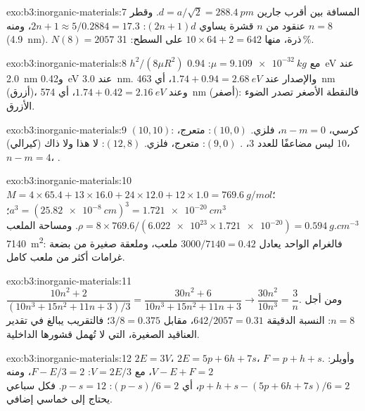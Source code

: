 \begin{solution}{exo:b3:inorganic-materials:7}
المسافة بين أقرب جارين $d = a/\sqrt2 = \qty{288.4}{pm}$. وقطر عنقود من $n$ قشرة يساوي $(2n + 1)d$:
$2n + 1 \approx 5/0.2884 = 17.3$، ومنه $n = 8$ (\qty{4.9}{nm}). $N(8) = 2057$ ذرة، منها $10 \times 64 + 2 = 642$ على السطح:
31\,\%.
\end{solution}

\begin{solution}{exo:b3:inorganic-materials:8}
$h^2/(8\mu R^2)$ مع $\mu = \qty{9.109e-32}{kg}$: \qty{0.94}{eV} عند \qty{2.0}{nm} و\qty{0.42}{eV} عند \qty{3.0}{nm}. والإصدار عند
$1.74 + 0.94 = \qty{2.68}{eV}$، أي \qty{463}{nm} (أزرق)، وعند $1.74 + 0.42 = \qty{2.16}{eV}$، أي \qty{574}{nm} (أصفر): فالنقطة الأصغر
تصدر الضوء الأزرق.
\end{solution}

\begin{solution}{exo:b3:inorganic-materials:9}
$(10, 10)$: كرسي، $n - m = 0$، فلزي. $(10, 0)$: متعرج، 10 ليس مضاعفًا للعدد 3، .
$(9, 0)$: متعرج، فلزي. $(12, 8)$: لا هذا ولا ذاك (كيرالي)، $n - m = 4$، .
\end{solution}

\begin{solution}{exo:b3:inorganic-materials:10}
$M = 4 \times 65.4 + 13 \times 16.0 + 24 \times 12.0 + 12 \times 1.0 = \qty{769.6}{g/mol}$؛ $a^3 = (\qty{25.82e-8}{cm})^3 = \qty{1.721e-20}{cm^3}$؛
$\rho = 8 \times 769.6/(\num{6.022e23} \times \num{1.721e-20}) = \qty{0.594}{g.cm^{-3}}$. ومساحة الملعب \qty{7140}{m^2}: فالغرام الواحد يعادل
$3000/7140 = 0.42$ ملعب، وملعقة صغيرة من بضعة غرامات أكثر من ملعب كامل.
\end{solution}

\begin{solution}{exo:b3:inorganic-materials:11}
$\dfrac{10n^2 + 2}{(10n^3 + 15n^2 + 11n + 3)/3} = \dfrac{30n^2 + 6}{10n^3 + 15n^2 + 11n + 3} \to \dfrac{30n^2}{10n^3} = \dfrac3n$. ومن أجل $n = 8$: النسبة الدقيقة
$642/2057 = 0.31$، مقابل $3/8 = 0.375$؛ فالتقريب يبالغ في تقدير العناقيد الصغيرة،
التي لا تُهمل قشورها الداخلية.
\end{solution}

\begin{solution}{exo:b3:inorganic-materials:12}
$2E = 3V$، $2E = 5p + 6h + 7s$، $F = p + h + s$. وأويلر: $V - E + F = 2$، مع $V = 2E/3$: $F - E/3 = 2$، ومنه
$p + h + s - (5p + 6h + 7s)/6 = 2$، أي $(p - s)/6 = 2$: $p - s = 12$. فكل سباعي يحتاج إلى خماسي
إضافي.
\end{solution}

